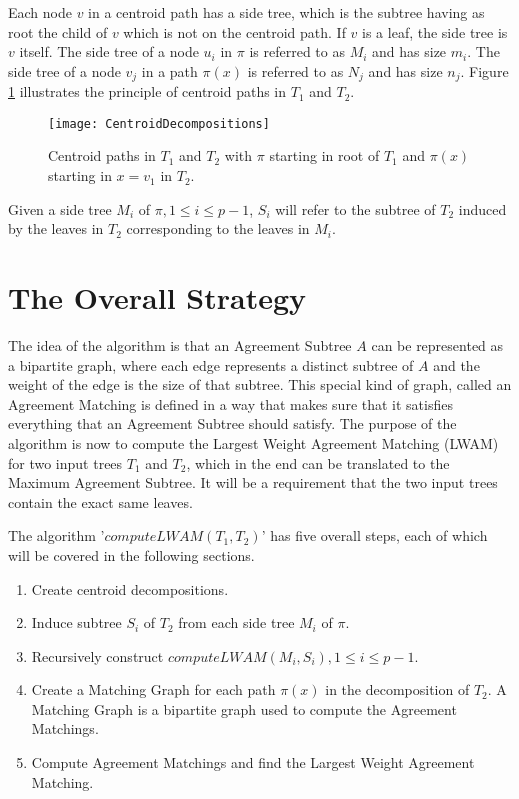 Each node $v$ in a centroid path has a side tree, which is the subtree having as root the child of $v$ which is not on the centroid path. If $v$ is a leaf, the side tree is $v$ itself. The side tree of a node $u_i$ in $\pi$ is referred to as $M_i$ and has size $m_i$. The side tree of a node $v_j$ in a path $\pi(x)$ is referred to as $N_j$ and has size $n_j$. Figure \ref{centroidFigure} illustrates the principle of centroid paths in $T_1$ and $T_2$.

\begin{figure}
	\label{centroidFigure}
	\texttt{[image: CentroidDecompositions]}
	\caption{Centroid paths in $T_1$ and $T_2$ with $\pi$ starting in root of $T_1$ and $\pi(x)$ starting in $x = v_1$ in $T_2$. \cite{nlogn}}
\end{figure}

Given a side tree $M_i$ of $\pi, 1 \le i \le p-1$, $S_i$ will refer to the subtree of $T_2$ induced by the leaves in $T_2$ corresponding to the leaves in $M_i$.

\section{The Overall Strategy}
The idea of the algorithm is that an Agreement Subtree $A$ can be represented as a bipartite graph, where each edge represents a distinct subtree of $A$ and the weight of the edge is the size of that subtree. This special kind of graph, called an Agreement Matching is defined in a way that makes sure that it satisfies everything that an Agreement Subtree should satisfy. The purpose of the algorithm is now to compute the Largest Weight Agreement Matching (LWAM) for two input trees $T_1$ and $T_2$, which in the end can be translated to the Maximum Agreement Subtree. It will be a requirement that the two input trees contain the exact same leaves.

The algorithm '$computeLWAM(T_1,T_2)$' has five overall steps, each of which will be covered in the following sections.

\begin{enumerate}
	\item Create centroid decompositions.
	\item Induce subtree $S_i$ of $T_2$ from each side tree $M_i$ of $\pi$.
	\item Recursively construct $computeLWAM(M_i, S_i), 1 \le i \le p-1$.
	\item Create a Matching Graph for each path $\pi(x)$ in the decomposition of $T_2$.
		\subitem A Matching Graph is a bipartite graph used to compute the Agreement Matchings.
	\item Compute Agreement Matchings and find the Largest Weight Agreement Matching.
\end{enumerate}

